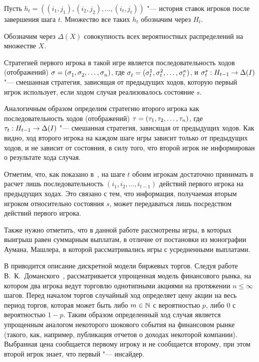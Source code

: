 Пусть $h_t = \left((i_1, j_1), (i_2, j_2), \ldots, (i_t, j_t)\right)$ "--- история ставок игроков после завершения шага $t$.
Множество все таких $h_t$ обозначим через $H_t$. 

Обозначим через $\Delta(X)$ совокупность всех вероятностных распределений на множестве $X$.

Стратегией первого игрока в такой игре является последовательность ходов (отображений) $\sigmar = (\sigmas{1}, \sigmas{2}, \ldots, \sigmas{n})$, где $\sigmas{t} = (\sigmas[1]{t}, \sigmas[2]{t}, \ldots, \sigmas[\kappa]{t})$, и $\sigmas[s]{t}: H_{t-1} \rightarrow \Delta(I)$ "--- смешанная стратегия, зависящая от предыдущих ходов, которую первый игрок использует, если ходом случая реализовалось состояние $s$.

Аналогичным образом определим стратегию второго игрока как последовательность ходов (отображений) $\tau = (\tau_{1}, \tau_{2}, \ldots, \tau_{n})$, где $\tau_{t}: H_{t-1} \rightarrow \Delta(I)$ "--- смешанная стратегия, зависящая от предыдущих ходов.
Как видно, ход второго игрока на каждом шаге игры зависит только от предыдущих ходов, и не зависит от состояния, в силу того, что второй игрок не информирован о результате хода случая.

Отметим, что, как показано в~\cite{mertens15}, на шаге $t$ обоим игрокам достаточно принимать в расчет лишь последовательность $(i_1, i_2, \ldots, i_{t-1})$ действий первого игрока на предыдущих ходах.
Это связано с тем, что информация, получаемая вторым игроком относительно состояния $s$, может передаваться лишь посредством действий первого игрока.

Также нужно отметить, что в данной работе рассмотрены игры, в которых выигрыш равен суммарным выплатам, в отличие от постановки из монографии Аумана, Машлера, в которой рассматривались игры с усредненными выплатами.

В  приводится описание дискретной модели биржевых торгов.
Следуя работе В.~К.~Доманского~\cite{domansky07}, рассматривается упрощенная модель финансового рынка, на котором два игрока ведут торговлю однотипными акциями на протяжении $n \leqslant \infty$ шагов.
%
Перед началом торгов случайный ход определяет цену акции на весь период торгов, которая может быть либо $m \in \mathbb{N}$ с вероятностью $p$, либо $0$ с вероятностью $1-p$.
Таким образом определенный ход случая является упрощенным аналогом некоторого шокового события на финансовом рынке (такого, как, например, публикация отчетов о доходах некоторой компании).
Выбранная цена сообщается первому игроку и не сообщается второму, при этом второй игрок знает, что первый "--- инсайдер.

